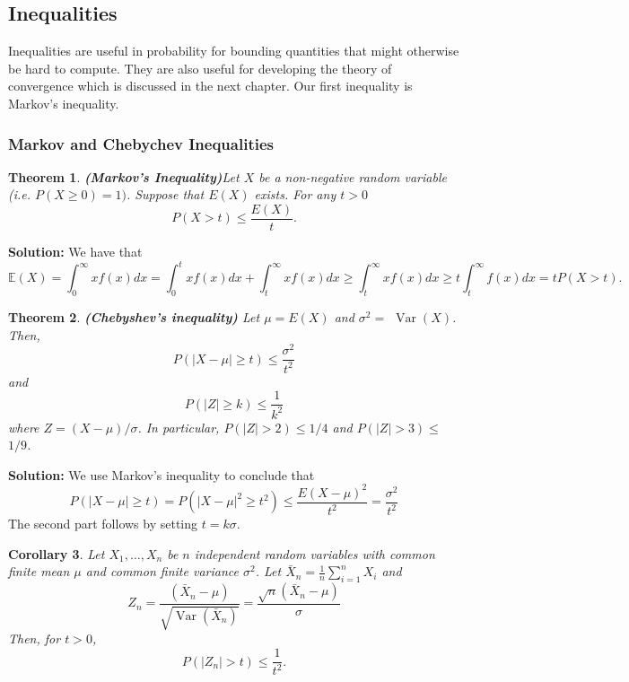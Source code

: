 \documentclass[13pt]{article}
\newtheorem{theorem}{Theorem}[section]
\newtheorem{corollary}[theorem]{Corollary}
\theoremstyle{definition}
\newenvironment{solution}
{\color{C2}\begin{framed}\begingroup\textbf{Solution:} }
  {\endgroup\end{framed}}
\theoremstyle{remark}
\newcommand{\EE}{\mathbb{E}}
\begin{document}
\subsection{Inequalities}
Inequalities are useful in probability for bounding quantities that might otherwise be hard to compute. They are also useful for developing the theory of convergence which is discussed in the next chapter. Our first inequality is Markov's inequality.

\subsubsection{Markov and Chebychev Inequalities}
\begin{theorem}
    \textbf{(Markov's Inequality)}Let $X$ be a non-negative random variable (i.e. $P(X \geq 0)=1)$. Suppose that $E(X)$ exists. For any $t>0$
$$
P(X>t) \leq \frac{E(X)}{t} .
$$
\end{theorem}
\begin{solution}
    We have that \[
    \EE(X)=\int_{0}^{\infty} x f(x) d x=\int_{0}^{t} x f(x) d x+\int_{t}^{\infty} x f(x) d x \geq\int_{t}^{\infty} x f(x) d x \geq t \int_{t}^{\infty} f(x) d x=t P(X>t).\]
\end{solution}

\begin{theorem}
    \textbf{(Chebyshev's inequality)} Let $\mu=E(X)$ and $\sigma^{2}=$ $\operatorname{Var}(X)$. Then,
$$
P(|X-\mu| \geq t) \leq \frac{\sigma^{2}}{t^{2}}
$$
and
$$
P(|Z| \geq k) \leq \frac{1}{k^{2}}
$$
where $Z=(X-\mu) / \sigma$. In particular, $P(|Z|>2) \leq 1 / 4$ and $P(|Z|>3) \leq$ $1 / 9$.
\end{theorem} 

\begin{solution}
    We use Markov's inequality to conclude that
$$
P(|X-\mu| \geq t)=P\left(|X-\mu|^{2} \geq t^{2}\right) \leq \frac{E(X-\mu)^{2}}{t^{2}}=\frac{\sigma^{2}}{t^{2}}
$$
The second part follows by setting $t=k \sigma$.
\end{solution}

\begin{corollary}Let $X_{1}, \ldots, X_{n}$ be $n$ independent random variables with common finite mean $\mu$ and common finite variance $\sigma^{2}$. Let $\bar{X}_{n}=\frac{1}{n} \sum_{i=1}^{n} X_{i}$ and 
$$
Z_{n}=\frac{\left(\bar{X}_{n}-\mu\right)}{\sqrt{\operatorname{Var}\left(\bar{X}_{n}\right)}}=\frac{\sqrt{n}\left(\bar{X}_{n}-\mu\right)}{\sigma}
$$
Then, for $t>0$,
$$
P\left(\left|Z_{n}\right|>t\right) \leq \frac{1}{t^{2}} .
$$
\end{corollary} 
\end{document}
